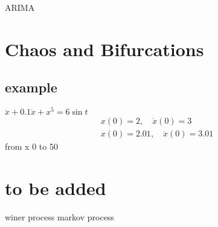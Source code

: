 \documentclass[a4paper,12pt]{article}
\begin{document}
ARIMA

\section{Chaos and Bifurcations}
\label{sec:org5158bfe}
\subsection{example}
\label{sec:orgd4adbe1}
\(\ddot{x}+0.1 \dot{x}+x^{5}=6 \sin t\)
\begin{equation}
\begin{array}{l}{x(0)=2, \quad \dot x(0)=3} \\
 {x(0)=2.01, \quad \dot{x}(0)=3.01}\end{array}
\end{equation}
from x 0 to 50 


\section{to be added}
\label{sec:orgfa534b6}
winer process 
markov process
\end{document}
